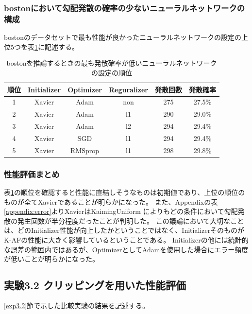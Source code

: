 \subsubsection{bostonにおいて勾配発散の確率の少ないニューラルネットワークの構成}
bostonのデータセットで最も性能が良かったニューラルネットワークの設定の上位5つを表\ref{bostonbest}に記述する。


\begin{table}[htbp]
    \begin{center}
        \caption{bostonを推論するときの最も発散確率が低いニューラルネットワークの設定の順位}
        \label{bostonbest}
        \vspace{2mm} 
        \begin{tabular}{ |c||c|c|c|c|c| }
        \hline
        順位 & Initializer & Optimizer &  Reguralizer & 発散回数 & 発散確率 \\
        \hline
        1 & Xavier & Adam & non & 275 & 27.5\%　\\
        \hline
        2 & Xavier & Adam & l1 & 290 & 29.0\%　\\
        \hline
        3 & Xavier & Adam & l2 & 294 & 29.4\%　\\
        \hline
        4 & Xavier & SGD & l1 & 294 & 29.4\%　\\
        \hline
        5 & Xavier & RMSprop & l1 & 298 & 29.8\%　\\
        \hline
        \end{tabular}
    \end{center}
\end{table}


\subsubsection{性能評価まとめ}
表\ref{bostonbest}の順位を確認すると性能に直結しそうなものは初期値であり、上位の順位のものが全てXavierであることが明らかになった。
また、Appendixの表\ref{appendix:error}よりXavierはKaimingUniform によりもどの条件において勾配発散の発生回数が半分程度だったことが判明した。
この議論において大切なことは、どのInitializer性能が向上したかということではなく、InitializerそのものがK-AFの性能に大きく影響しているということである。
Initializerの他には統計的な誤差の範囲内ではあるが、OptimizerとしてAdamを使用した場合にエラー頻度が低いことが明らかになった。

\subsection{実験3.2 クリッピングを用いた性能評価}
\label{evo3.2}
\ref{exp3.2}節で示した比較実験の結果を記述する。


